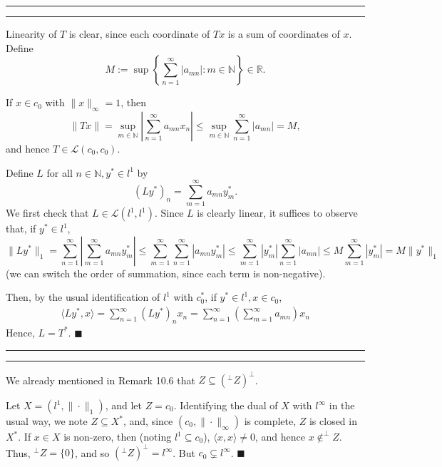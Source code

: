 \documentclass[11pt]{article}
\newcounter{questionCounter}
\newcounter{partCounter}[questionCounter]
\newenvironment{question}[2][\arabic{questionCounter}]{%
    \setcounter{partCounter}{0}%
    \vspace{.25in} \hrule \vspace{0.5em}%
        \noindent{\bf #2}%
    \vspace{0.8em} \hrule \vspace{.10in}%
    \addtocounter{questionCounter}{1}%
}{}
\renewcommand{\qed}{\quad $\blacksquare$}
\newcommand{\N}{\mathbb{N}} %
\newcommand{\R}{\mathbb{R}} %
\renewcommand{\L}{\mathcal{L}} %
\begin{document}
\begin{question}{Problem 5}
Linearity of $T$ is clear, since each coordinate of $Tx$ is a sum of
coordinates of $x$. Define
\[M
 := \sup \left\{ \sum_{n = 1}^{\infty} |a_{mn}| : m \in \N \right\}
    \in \R
.\]

If $x \in c_0$ with $\|x\|_{\infty} = 1$, then
\[\|Tx\|
 =      \sup_{m \in \N} \left| \sum_{n = 1}^{\infty} a_{mn} x_n \right|
 \leq   \sup_{m \in \N} \sum_{n = 1}^{\infty} |a_{mn}|
 = M,
\]
and hence $T \in \L(c_0,c_0)$.

Define $L$ for all $n \in \N, y^* \in l^1$ by
\[(Ly^*)_n = \sum_{m = 1}^{\infty} a_{mn} y^*_m.\]
We first check that $L \in \L(l^1,l^1)$. Since $L$ is clearly linear, it
suffices to observe that, if $y^* \in l^1$,
\[\|Ly^*\|_1
    = \sum_{n = 1}^{\infty} \left| \sum_{m = 1}^{\infty} a_{mn} y^*_m \right|
    \leq \sum_{m = 1}^{\infty} \sum_{n = 1}^{\infty} | a_{mn} y^*_m |
    \leq \sum_{m = 1}^{\infty} |y^*_m| \sum_{n = 1}^{\infty} | a_{mn} |
    \leq M \sum_{m = 1}^{\infty} |y^*_m|
    = M \|y^*\|_1
\]
(we can switch the order of summation, since each term
is non-negative).

Then, by the usual identification of $l^1$ with $c_0^*$, if
$y^* \in l^1, x \in c_0$,
\begin{align*}
\langle Ly^*,x \rangle
    = \sum_{n = 1}^{\infty} \left( Ly^* \right)_n x_n
    = \sum_{n = 1}^{\infty} \left( \sum_{m = 1}^{\infty} a_{mn} \right) x_n
\end{align*}
Hence, $L = T^*$. \qed
\end{question}

\begin{question}{Problem 7}
We already mentioned in Remark 10.6 that
$Z \subseteq \left( ^\perp Z \right)^\perp$.

Let $X = (l^1,\|\cdot\|_1)$, and let $Z = c_0$. Identifying the dual of $X$
with $l^\infty$ in the usual way, we note $Z \subseteq X^*$, and, since
$(c_0,\|\cdot\|_\infty)$ is complete, $Z$ is closed in $X^*$. If $x \in X$ is
non-zero, then (noting $l^1 \subseteq c_0$), $\langle x, x \rangle \neq 0$, and
hence $x \notin ^\perp Z$. Thus, $^\perp Z = \{0\}$, and so
$\left( ^\perp Z \right)^\perp = l^\infty$. But $c_0 \subsetneq l^\infty$. \qed
\end{question}
\end{document}
